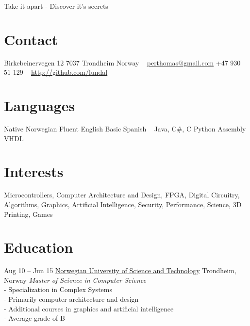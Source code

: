 \documentclass[print]{friggeri-cv}
\begin{document}
       {Take it apart - Discover it's secrets}


\begin{aside}
    \section{Contact}
        Birkebeinervegen 12
        7037 Trondheim
        Norway
        ~
        \href{mailto:perthomas@gmail.com}{perthomas@gmail.com}
        +47 930 51 129
        ~
        \href{http://github.com/lundal}{http://github.com/lundal}
    \section{Languages}
        Native Norwegian
        Fluent English
        Basic Spanish
        ~
        Java, C\#, C
        Python
        Assembly
        VHDL
\end{aside}

\section{Interests}

Microcontrollers,
Computer Architecture and Design,
FPGA,
Digital Circuitry,
Algorithms,
Graphics,
Artificial Intelligence,
Security,
Performance,
Science,
3D Printing,
Games

\section{Education}

\begin{entrylist}
    \entry
        {Aug 10 – Jun 15}
        {\href{http://ntnu.no/}{Norwegian University of Science and Technology}}
        {Trondheim, Norway}
        {\emph{Master of Science in Computer Science}\\
        - Specialization in Complex Systems\\
        - Primarily computer architecture and design\\
        - Additional courses in graphics and artificial intelligence\\
        - Average grade of B}
\end{entrylist}
\end{document}
